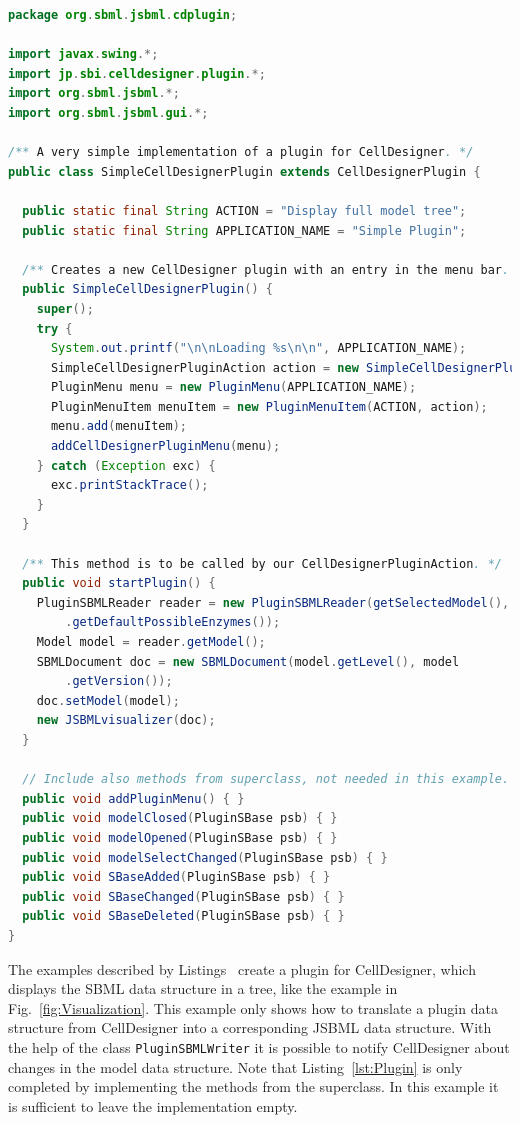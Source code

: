 \begin{lstlisting}[language=Java,float,caption={A simple example for a
CellDesigner plugin using JSBML as a communication layer},label=lst:Plugin]
package org.sbml.jsbml.cdplugin;

import javax.swing.*;
import jp.sbi.celldesigner.plugin.*;
import org.sbml.jsbml.*;
import org.sbml.jsbml.gui.*;

/** A very simple implementation of a plugin for CellDesigner. */
public class SimpleCellDesignerPlugin extends CellDesignerPlugin {

  public static final String ACTION = "Display full model tree";
  public static final String APPLICATION_NAME = "Simple Plugin";

  /** Creates a new CellDesigner plugin with an entry in the menu bar. */
  public SimpleCellDesignerPlugin() {
    super();
    try {
      System.out.printf("\n\nLoading %s\n\n", APPLICATION_NAME);
      SimpleCellDesignerPluginAction action = new SimpleCellDesignerPluginAction(this);
      PluginMenu menu = new PluginMenu(APPLICATION_NAME);
      PluginMenuItem menuItem = new PluginMenuItem(ACTION, action);
      menu.add(menuItem);
      addCellDesignerPluginMenu(menu);
    } catch (Exception exc) {
      exc.printStackTrace();
    }
  }

  /** This method is to be called by our CellDesignerPluginAction. */
  public void startPlugin() {
    PluginSBMLReader reader = new PluginSBMLReader(getSelectedModel(), SBO
        .getDefaultPossibleEnzymes());
    Model model = reader.getModel();
    SBMLDocument doc = new SBMLDocument(model.getLevel(), model
        .getVersion());
    doc.setModel(model);
    new JSBMLvisualizer(doc);
  }

  // Include also methods from superclass, not needed in this example.
  public void addPluginMenu() { }
  public void modelClosed(PluginSBase psb) { }
  public void modelOpened(PluginSBase psb) { }
  public void modelSelectChanged(PluginSBase psb) { }
  public void SBaseAdded(PluginSBase psb) { }
  public void SBaseChanged(PluginSBase psb) { }
  public void SBaseDeleted(PluginSBase psb) { }
}
\end{lstlisting}
The examples described by Listings~
create a plugin for CellDesigner, which displays the SBML data structure
in a tree, like the example in Fig.~\vref{fig:Visualization}. This example only
shows how to translate a plugin data structure
from CellDesigner into a corresponding JSBML data structure. With the help of
the class \texttt{PluginSBMLWriter} it is possible to notify CellDesigner about
changes in the model data structure. Note that Listing~\vref{lst:Plugin} is only
completed by implementing the methods from the superclass. In this example it
is sufficient to leave the implementation empty.


